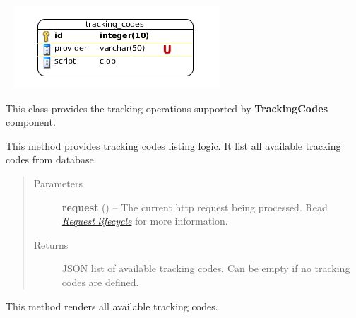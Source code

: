 \documentclass[letterpaper,10pt,english]{sphinxmanual}
\begin{document}
\begin{fulllineitems}
\label{features/components/tracking_codes/tracking_codes:fantastico.contrib.tracking_codes.tracking_controller.TrackingController}~
\includegraphics{erd2.png}

This class provides the tracking operations supported by \textbf{TrackingCodes} component.

\begin{fulllineitems}
\label{features/components/tracking_codes/tracking_codes:fantastico.contrib.tracking_codes.tracking_controller.TrackingController.list_codes}
This method provides tracking codes listing logic. It list all available tracking codes from database.
\begin{quote}\begin{description}
\item[{Parameters}] \leavevmode
\textbf{request} () -- The current http request being processed. Read {\hyperref[features/request_response::doc]{\emph{Request lifecycle}}} for more information.

\item[{Returns}] \leavevmode
JSON list of available tracking codes. Can be empty if no tracking codes are defined.

\end{description}\end{quote}

\end{fulllineitems}


\begin{fulllineitems}
\label{features/components/tracking_codes/tracking_codes:fantastico.contrib.tracking_codes.tracking_controller.TrackingController.list_codes_ui}
This method renders all available tracking codes.

\end{fulllineitems}


\end{fulllineitems}
\end{document}

